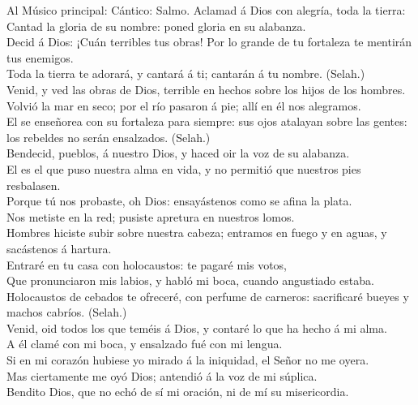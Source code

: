  Al Músico principal: Cántico: Salmo. Aclamad á Dios con
alegría, toda la tierra:\\
 Cantad la gloria de su nombre: poned gloria en su
alabanza.\\
 Decid á Dios: ¡Cuán terribles tus obras! Por lo grande de
tu fortaleza te mentirán tus enemigos.\\
 Toda la tierra te adorará, y cantará á ti; cantarán á tu
nombre. (Selah.)\\
 Venid, y ved las obras de Dios, terrible en hechos sobre
los hijos de los hombres.\\
 Volvió la mar en seco; por el río pasaron á pie; allí en
él nos alegramos.\\
 El se enseñorea con su fortaleza para siempre: sus ojos
atalayan sobre las gentes: los rebeldes no serán ensalzados. (Selah.)\\
 Bendecid, pueblos, á nuestro Dios, y haced oir la voz de
su alabanza.\\
 El es el que puso nuestra alma en vida, y no permitió que
nuestros pies resbalasen.\\
 Porque tú nos probaste, oh Dios: ensayástenos como se
afina la plata.\\
 Nos metiste en la red; pusiste apretura en nuestros
lomos.\\
 Hombres hiciste subir sobre nuestra cabeza; entramos en
fuego y en aguas, y sacástenos á hartura.\\
 Entraré en tu casa con holocaustos: te pagaré mis
votos,\\
 Que pronunciaron mis labios, y habló mi boca, cuando
angustiado estaba.\\
 Holocaustos de cebados te ofreceré, con perfume de
carneros: sacrificaré bueyes y machos cabríos. (Selah.)\\
 Venid, oid todos los que teméis á Dios, y contaré lo que
ha hecho á mi alma.\\
 A él clamé con mi boca, y ensalzado fué con mi lengua.\\
 Si en mi corazón hubiese yo mirado á la iniquidad, el
Señor no me oyera.\\
 Mas ciertamente me oyó Dios; antendió á la voz de mi
súplica.\\
 Bendito Dios, que no echó de sí mi oración, ni de mí su
misericordia.

